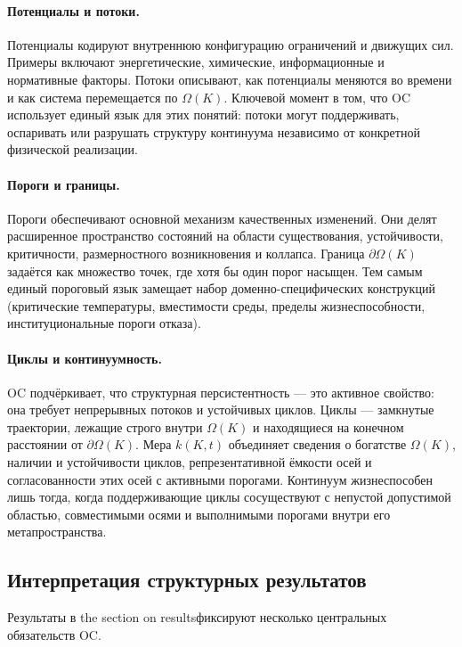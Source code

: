 \paragraph{Потенциалы и потоки.}
Потенциалы кодируют внутреннюю конфигурацию ограничений и движущих сил.
Примеры включают энергетические, химические, информационные и нормативные
факторы.
Потоки описывают, как потенциалы меняются во времени и как система перемещается
по \(\Omega(K)\).
Ключевой момент в том, что OC использует единый язык для этих понятий:
потоки могут поддерживать, оспаривать или разрушать структуру континуума независимо
от конкретной физической реализации.

\paragraph{Пороги и границы.}
Пороги обеспечивают основной механизм качественных изменений.
Они делят расширенное пространство состояний на области существования, устойчивости,
критичности, размерностного возникновения и коллапса.
Граница \(\partial\Omega(K)\) задаётся как множество точек, где хотя бы один порог
насыщен.
Тем самым единый пороговый язык замещает набор доменно-специфических конструкций
(критические температуры, вместимости среды, пределы жизнеспособности,
институциональные пороги отказа).

\paragraph{Циклы и континуумность.}
OC подчёркивает, что структурная персистентность — это активное свойство:
она требует непрерывных потоков и устойчивых циклов.
Циклы — замкнутые траектории, лежащие строго внутри \(\Omega(K)\) и находящиеся на
конечном расстоянии от \(\partial\Omega(K)\).
Мера \(k(K,t)\) объединяет сведения о богатстве \(\Omega(K)\), наличии и устойчивости
циклов, репрезентативной ёмкости осей и согласованности этих осей с активными порогами.
Континуум жизнеспособен лишь тогда, когда поддерживающие циклы сосуществуют с
непустой допустимой областью, совместимыми осями и выполнимыми порогами внутри
его метапространства.

\subsection{Интерпретация структурных результатов}

Результаты в the section on resultsфиксируют несколько центральных обязательств OC.

